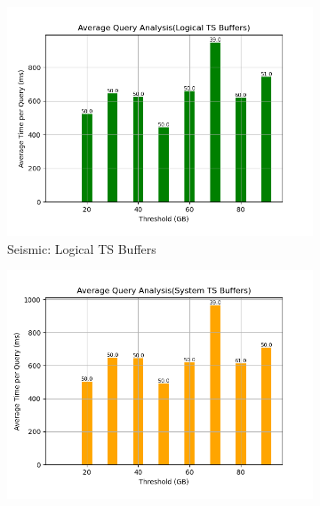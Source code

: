 \begin{figure}
	\centering
	\begin{subfigure}[c]{0.45\textwidth}
		\includegraphics[width=1\textwidth]   {figures/Experiments/Dynamic/SEISMIC/batch_answering/35/average_query_time_per_batch_version_999777015_10485760_10_delay[35].png}
		\caption{Seismic: Logical TS Buffers}
		\label{fig:logical-ts-35-seismic}
	\end{subfigure}
	\begin{subfigure}[c]{0.45\textwidth}
		\includegraphics[width=1\textwidth]	 {figures/Experiments/Dynamic/SEISMIC/batch_answering/35/average_query_time_per_batch_version_999777018_10485760_10_delay[35].png}

\end{subfigure}
\end{figure}
